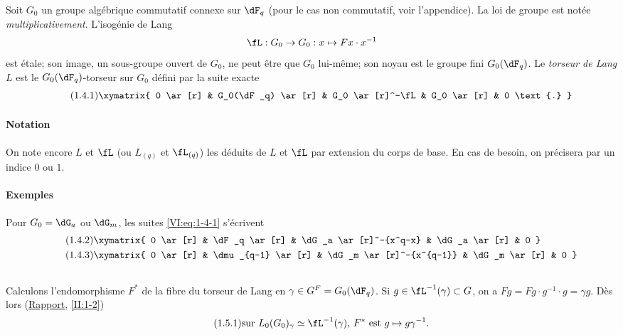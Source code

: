 Soit $G_0$ un groupe algébrique commutatif connexe sur $\dF_q$ (pour le cas 
non commutatif, voir l'appendice). La loi de groupe est notée 
\emph{multiplicativement}. L'isogénie de Lang 
\[
\fL:G_0 \to G_0: x\mapsto F x\cdot x^{-1}
\]
est étale; son image, un sous-groupe ouvert de $G_0$, ne peut être que 
$G_0$ lui-même; son noyau est le groupe fini $G_0(\dF_q)$. Le \emph{torseur 
de Lang} $L$ est le $G_0(\dF_q)$-torseur sur $G_0$ défini par la suite 
exacte 
\begin{equation*}\tag{1.4.1}\label{VI:eq:1-4-1}
\xymatrix{
  0 \ar[r] 
    & G_0(\dF_q) \ar[r] 
    & G_0 \ar[r]^-\fL 
    & G_0 \ar[r] 
    & 0 \text{.}
}
\end{equation*}


\paragraph{Notation}
On note encore $L$ et $\fL$ (ou $L_{(q)}$ et $\fL_{(q)}$) les  déduits 
de $L$ et $\fL$ par extension du corps de base. En cas de besoin, on 
précisera par un indice $0$ ou $1$.


\paragraph{Exemples}
Pour $G_0=\dG_a$ ou $\dG_m$, les suites \eqref{VI:eq:1-4-1} s'écrivent 
\begin{align*}\tag{1.4.2}\label{VI:eq:1-4-2}
&\xymatrix{
  0 \ar[r] 
    & \dF_q \ar[r] 
    & \dG_a \ar[r]^-{x^q-x} 
    & \dG_a \ar[r] 
    & 0 
} \\
\tag{1.4.3}\label{VI:eq:1-4-3}
&\xymatrix{
  0 \ar[r] 
    & \dmu_{q-1} \ar[r] 
    & \dG_m \ar[r]^-{x^{q-1}} 
    & \dG_m \ar[r] 
    & 0
}
\end{align*}





\subsection{}\label{VI:1-5}

Calculons l'endomorphisme $F^\ast$ de la fibre du torseur de Lang en 
$\gamma\in G^F=G_0(\dF_q)$. Si $g\in \fL^{-1}(\gamma)\subset G$, on a 
$F g = F g\cdot g^{-1}\cdot g = \gamma g$. Dès lors (\hyperref[II]{Rapport}, 
\ref{II:1-2}) 
\begin{equation*}\tag{1.5.1}\label{VI:eq:1-5-1}
  \text{sur $L_0(G_0)_\gamma\simeq \fL^{-1}(\gamma)$, $F^\ast$ est $g\mapsto g\gamma^{-1}$.}
\end{equation*}





